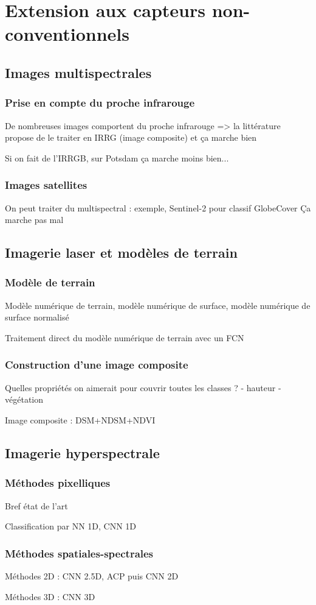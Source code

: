 \chapter{Extension aux capteurs non-conventionnels}

\section{Images multispectrales}

\subsection{Prise en compte du proche infrarouge}

De nombreuses images comportent du proche infrarouge
=> la littérature propose de le traiter en IRRG (image composite) et ça marche bien

Si on fait de l'IRRGB, sur Potsdam ça marche moins bien...

\subsection{Images satellites}

On peut traiter du multispectral : exemple, Sentinel-2 pour classif GlobeCover
Ça marche pas mal

\section{Imagerie laser et modèles de terrain}

\subsection{Modèle de terrain}

Modèle numérique de terrain, modèle numérique de surface, modèle numérique de surface normalisé

Traitement direct du modèle numérique de terrain avec un FCN

\subsection{Construction d'une image composite}

Quelles propriétés on aimerait pour couvrir toutes les classes ?
  - hauteur
  - végétation

Image composite : DSM+NDSM+NDVI

\section{Imagerie hyperspectrale}

\subsection{Méthodes pixelliques}

Bref état de l'art

Classification par NN 1D, CNN 1D

\subsection{Méthodes spatiales-spectrales}

Méthodes 2D : CNN 2.5D, ACP puis CNN 2D

Méthodes 3D : CNN 3D


